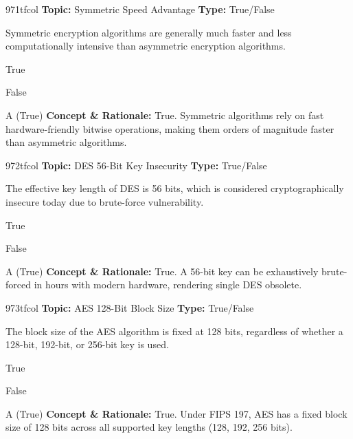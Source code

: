 \begin{qcard}{971}{tfcol}
\textcolor{darkslate!75}{\small\textbf{Topic:} Symmetric Speed Advantage \hfill \textbf{Type:} True/False}\vspace{0.4em}\par
Symmetric encryption algorithms are generally much faster and less computationally intensive than asymmetric encryption algorithms.
\begin{qoptions}
\item True
\item False
\end{qoptions}
\end{qcard}
\nopagebreak
\begin{explainbox}{A (True)}
\textbf{Concept \& Rationale:} True. Symmetric algorithms rely on fast hardware-friendly bitwise operations, making them orders of magnitude faster than asymmetric algorithms.
\end{explainbox}

\begin{qcard}{972}{tfcol}
\textcolor{darkslate!75}{\small\textbf{Topic:} DES 56-Bit Key Insecurity \hfill \textbf{Type:} True/False}\vspace{0.4em}\par
The effective key length of DES is 56 bits, which is considered cryptographically insecure today due to brute-force vulnerability.
\begin{qoptions}
\item True
\item False
\end{qoptions}
\end{qcard}
\nopagebreak
\begin{explainbox}{A (True)}
\textbf{Concept \& Rationale:} True. A 56-bit key can be exhaustively brute-forced in hours with modern hardware, rendering single DES obsolete.
\end{explainbox}

\begin{qcard}{973}{tfcol}
\textcolor{darkslate!75}{\small\textbf{Topic:} AES 128-Bit Block Size \hfill \textbf{Type:} True/False}\vspace{0.4em}\par
The block size of the AES algorithm is fixed at 128 bits, regardless of whether a 128-bit, 192-bit, or 256-bit key is used.
\begin{qoptions}
\item True
\item False
\end{qoptions}
\end{qcard}
\nopagebreak
\begin{explainbox}{A (True)}
\textbf{Concept \& Rationale:} True. Under FIPS 197, AES has a fixed block size of 128 bits across all supported key lengths (128, 192, 256 bits).
\end{explainbox}

